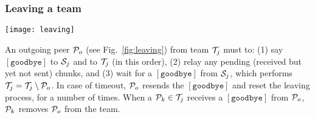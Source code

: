 \begin{comment}
$[{\cal L}]=[\{{\cal X}\in {\cal T}^0/|N({\cal
    X})|<K\}]$ (being $K$ the maximum connectivity degree and $N({\cal
  X})$ the neighborhood of ${\cal X}$), and after that, ${\cal S}^0$
adds ${\cal P}$ to ${\cal T}^0$. In parallel with the reception of
$[{\cal L}]$, ${\cal P}$ sends a $[\mathtt{hello}]$ message to each
$\{{\cal X}\in {\cal T}^0\}$. When a ${\cal X}$ receives a
$[\mathtt{hello}]$, replies to ${\cal R}$ with the same message. Then,
${\cal X}$ computes a $\text{RTT}({\cal X})$ (Round-Trip Time) for
each $[\mathtt{hello}]$ reply, and sends to the $K$ peers with lowest
RTT
a $[\mathtt{neighborhood\_request}]$ message, which ${\cal X}$ must
reply with a $[\mathtt{neighborhood\_accept}]$, if ${\cal X}$ accepts
${\cal P}$ as a neighbor. For each found neighbor ${\cal X}$, ${\cal
  P}$ sends to ${\cal S}^0$ a $[\mathtt{neighborhood\_accepted}~{\cal
    X}]$, and ${\cal S}^0$ updates $N({\cal P}) = N({\cal P}) \cup
\{{\cal X}\}$.
\end{comment}


\subsubsection{Leaving a team}
\label{dbs:leaving}
\begin{figure*}
  \texttt{[image: leaving]}
  \caption{Peer leaving.\label{fig:leaving}}
\end{figure*}
An outgoing peer ${\cal P}_o$ (see Fig.~\ref{fig:leaving}) from team
${\cal T}_j$ must to: (1) say $[\mathtt{goodbye}]$ to ${\cal S}_j$ and
to ${\cal T}_j$
(in this order), (2) relay any pending (received but
yet not sent) chunks, and (3) wait for a $[\mathtt{goodbye}]$ from
${\cal S}_j$, which performs ${\cal T}_j = {\cal T}_j \setminus {\cal
  P}_o$. In case of timeout, ${\cal P}_o$ resends the
$[\mathtt{goodbye}]$ and reset the leaving process, for a number of
times. When a ${\cal P}_k\in {\cal T}_j$
receives a
$[\mathtt{goodbye}]$ from ${\cal P}_o$, ${\cal P}_k$ removes
${\cal P}_o$ from the team.


